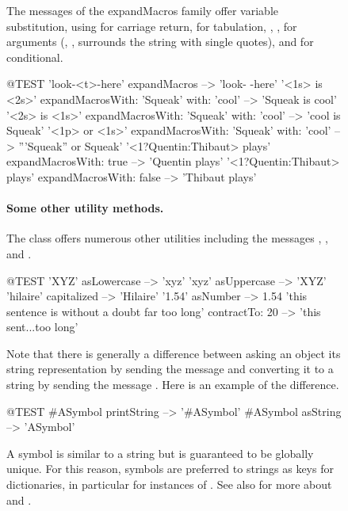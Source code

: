 \documentclass[a4paper,10pt,twoside]{book}
\begin{document}
\begin{figure}
\begin{center}
The messages of the expandMacros family offer variable substitution, using  for carriage return,  for tabulation, , ,  for arguments (, , surrounds the string with single quotes), and  for conditional.

\begin{code}{@TEST}
'look-<t>-here' expandMacros                                         --> 'look-	-here'
'<1s> is <2s>' expandMacrosWith: 'Squeak' with: 'cool'   --> 'Squeak is cool'
'<2s> is <1s>' expandMacrosWith: 'Squeak' with: 'cool'   --> 'cool is Squeak'
'<1p> or <1s>' expandMacrosWith: 'Squeak' with: 'cool'  --> '''Squeak'' or Squeak'
'<1?Quentin:Thibaut> plays' expandMacrosWith: true     --> 'Quentin plays'
'<1?Quentin:Thibaut> plays' expandMacrosWith: false    --> 'Thibaut plays'
\end{code}

\paragraph{Some other utility methods.}
The class  offers numerous other utilities including the messages , , and . 

\begin{code}{@TEST}
'XYZ' asLowercase --> 'xyz'
'xyz' asUppercase   --> 'XYZ'
'hilaire' capitalized   --> 'Hilaire'
'1.54' asNumber      --> 1.54
'this sentence is without a doubt far too long' contractTo: 20 --> 'this sent...too long'
\end{code}

Note that there is generally a difference between asking an object its string representation by sending the message  and converting it to a string by sending the message .
Here is an example of the difference.

\begin{code}{@TEST}
#ASymbol printString --> '#ASymbol'
#ASymbol asString    --> 'ASymbol'
\end{code}

A symbol is similar to a string but is guaranteed to be globally unique.
For this reason, symbols are preferred to strings as keys for dictionaries, in particular for instances of .
See also  for more about  and .


\end{center}
\end{figure}
\end{document}
